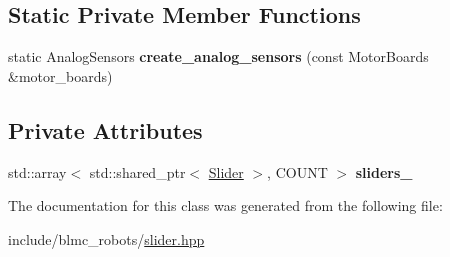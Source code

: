 \subsection*{Static Private Member Functions}
\begin{DoxyCompactItemize}
\item 
\mbox{\label{classblmc__robots_1_1Sliders_a852a682674219e1c95b6005b387ce5d5}} 
static Analog\+Sensors {\bfseries create\+\_\+analog\+\_\+sensors} (const Motor\+Boards \&motor\+\_\+boards)
\end{DoxyCompactItemize}
\subsection*{Private Attributes}
\begin{DoxyCompactItemize}
\item 
\mbox{\label{classblmc__robots_1_1Sliders_a1ecba536dcd14696e27379a0baed0471}} 
std\+::array$<$ std\+::shared\+\_\+ptr$<$ \hyperlink{classblmc__robots_1_1Slider}{Slider} $>$, C\+O\+U\+NT $>$ {\bfseries sliders\+\_\+}
\end{DoxyCompactItemize}


The documentation for this class was generated from the following file\+:\begin{DoxyCompactItemize}
\item 
include/blmc\+\_\+robots/\hyperlink{slider_8hpp}{slider.\+hpp}\end{DoxyCompactItemize}
